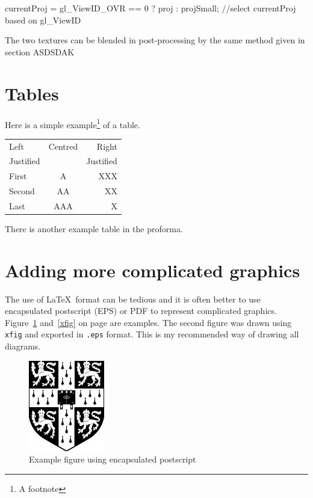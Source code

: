 \documentclass[12pt,a4paper,twoside,openright]{report}
\begin{document}
\begin{blockcode}
currentProj = gl_ViewID_OVR == 0 ? proj : projSmall; //select currentProj based on gl_ViewID 
\end{blockcode}

The two textures can be blended in post-processing by the same method given in section ASDSDAK


\section{Tables}

\begin{samepage}
Here is a simple example\footnote{A footnote} of a table.

\begin{center}
\begin{tabular}{l|c|r}
Left      & Centred & Right \\
Justified &         & Justified \\[3mm]
First     & A       & XXX \\
Second    & AA      & XX  \\
Last      & AAA     & X   \\
\end{tabular}
\end{center}

\noindent
There is another example table in the proforma.
\end{samepage}

\section{Adding more complicated graphics}

The use of \LaTeX\ format can be tedious and it is often better to use
encapsulated postscript (EPS) or PDF to represent complicated graphics.
Figure~\ref{epsfig} and~\ref{xfig} on page \pageref{xfig} are
examples. The second figure was drawn using \texttt{xfig} and exported in
{\tt.eps} format. This is my recommended way of drawing all diagrams.


\begin{figure}[tbh]
\centerline{\includegraphics{figs/cuarms.pdf}}
\caption{Example figure using encapsulated postscript}
\label{epsfig}
\end{figure}
\end{document}
